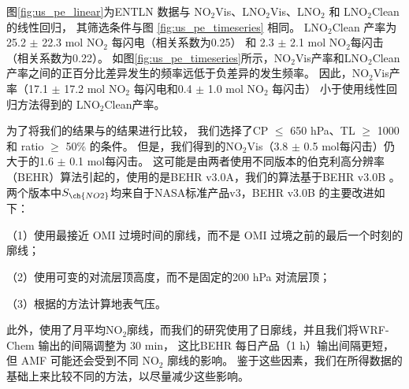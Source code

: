 图\ref{fig:us_pe_linear}为ENTLN 数据与 NO$_2$Vis、LNO$_2$Vis、LNO$_2$ 和 LNO$_2$Clean的线性回归，
其筛选条件与图 \ref{fig:us_pe_timeseries} 相同。
LNO$_2$Clean 产率为 25.2 $\pm$ 22.3 mol NO$_2$ 每闪电（相关系数为0.25）
和 2.3 $\pm$ 2.1 mol NO$_2$每闪击（相关系数为0.22）。
如图\ref{fig:us_pe_timeseries}所示，NO$_2$Vis产率和LNO$_2$Clean产率之间的正百分比差异发生的频率远低于负差异的发生频率。
因此，NO$_2$Vis产率（17.1 $\pm$ 17.2 mol NO$_2$ 每闪电和0.4 $\pm$ 1.0 mol NO$_2$ 每闪击）
小于使用线性回归方法得到的 LNO$_2$Clean产率。

为了将我们的结果与\citet{Lapierre.2020}的结果进行比较，
我们选择了CP $\leq$ 650 hPa、TL $\geq$ 1000 和 ratio $\geq$ 50\% 的条件。
但是，我们得到的NO$_2$Vis（3.8 $\pm$ 0.5 mol每闪击）仍大于\citet{Lapierre.2020}的1.6 $\pm$ 0.1 mol每闪击。
这可能是由两者使用不同版本的伯克利高分辨率（BEHR）算法引起的，\citet{Lapierre.2020}使用的是BEHR v3.0A，我们的算法基于BEHR v3.0B \citep{Laughner.2019a}。
两个版本中$S_{\ch{NO2}}$均来自于NASA标准产品v3，BEHR v3.0B 的主要改进如下：

（1）使用最接近 OMI 过境时间的廓线，而不是 OMI 过境之前的最后一个时刻的廓线；

（2）使用可变的对流层顶高度，而不是固定的200 hPa 对流层顶；

（3）根据\citet{Zhou.2009}的方法计算地表气压。

此外，\citet{Lapierre.2020}使用了月平均NO$_2$廓线，而我们的研究使用了日廓线，并且我们将WRF-Chem 输出的间隔调整为 30 min，
这比BEHR 每日产品（1 h）输出间隔更短，但 AMF 可能还会受到不同 NO$_2$ 廓线的影响。
鉴于这些因素，我们在所得数据的基础上来比较不同的方法，以尽量减少这些影响。

